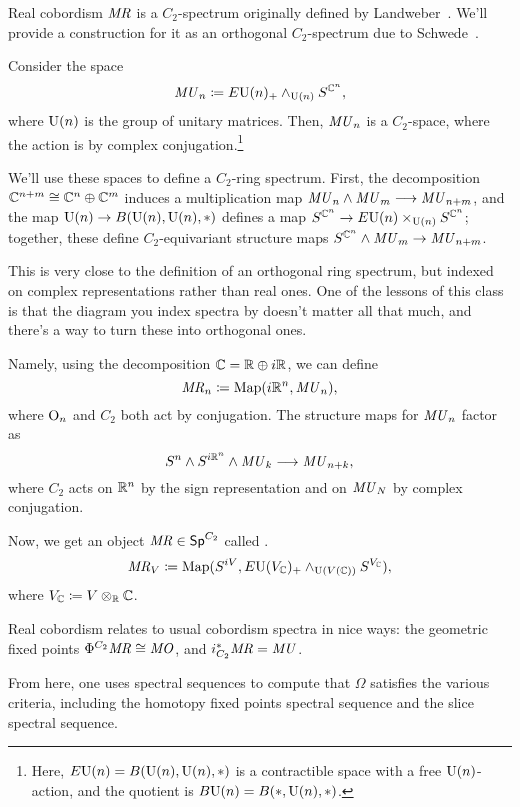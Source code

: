 \begin{defn}
Real cobordism $\mathit{MR}$ is a $C_2$-spectrum originally defined by Landweber~\cite{LandweberMR}. We'll provide a
construction for it as an orthogonal $C_2$-spectrum due to Schwede~\cite{SchwedeEquivariant}.

Consider the space
\[\mathit{MU}_n\coloneqq E\mathrm U(n)_+\wedge_{\mathrm U(n)} S^{\mathbb C^n},\]
where $\mathrm U(n)$ is the group of unitary matrices. Then, $\mathit{MU}_n$ is a $C_2$-space, where the action is by complex
conjugation.\footnote{Here, $E\mathrm U(n) = B(\mathrm U(n), \mathrm U(n), *)$ is a contractible space with a free $\mathrm U(n)$-action, and
the quotient is $B\mathrm U(n) = B(*, \mathrm U(n), *)$.}

We'll use these spaces to define a $C_2$-ring spectrum. First, the decomposition $\mathbb C^{n+m}\cong\mathbb C^n\oplus\mathbb C^m$
induces a multiplication map $\mathit{MU}_n\wedge\mathit{MU}_m\longrightarrow \mathit{MU}_{n+m}$, and the map $\mathrm U(n)\to B(\mathrm U(n), \mathrm U(n), *)$
defines a map $S^{\mathbb C^n}\to E\mathrm U(n)\times_{\mathrm U(n)} S^{\mathbb C^n}$; together, these define $C_2$-equivariant structure maps
$S^{\mathbb C^n}\wedge\mathit{MU}_m\to \mathit{MU}_{n+m}$.

This is very close to the definition of an orthogonal ring spectrum, but indexed on complex representations rather
than real ones. One of the lessons of this class is that the diagram you index spectra by doesn't matter all that
much, and there's a way to turn these  into orthogonal ones.

Namely, using the decomposition $\mathbb C = \mathbb R\oplus i\mathbb R$, we can define
\[\mathit{MR}_n\coloneqq \operatorname{Map}(i\mathbb R^n, \mathit{MU}_n),\]
where $\mathrm O_n$ and $C_2$ both act by conjugation. The structure maps for $\mathit{MU}_n$ factor as
\[S^n\wedge S^{i\mathbb R^n}\wedge\mathit{MU}_k\longrightarrow \mathit{MU}_{n+k},\]
where $C_2$ acts on $\mathbb R^n$ by the sign representation and on $\mathit{MU}_N$ by complex conjugation.

Now, we get an object $\mathit{MR}\in\mathsf{Sp}^{C_2}$ called .
\[\mathit{MR}_V \coloneqq \operatorname{Map}(S^{iV}, E\mathrm U(V_\mathbb C)_+\wedge_{\mathrm U(V(\mathbb C))}S^{V_\mathbb C}),\]
where $V_\mathbb C\coloneqq V\otimes_\mathbb R\mathbb C$.
\end{defn}
Real cobordism relates to usual cobordism spectra in nice ways: the geometric fixed points
$\Phi^{C_2}\mathit{MR}\cong\mathit{MO}$, and $i_{C_2}^*\mathit{MR} = \mathit{MU}$.

From here, one uses spectral sequences to compute that $\Omega$ satisfies the various criteria, including the
homotopy fixed points spectral sequence and the slice spectral sequence.
